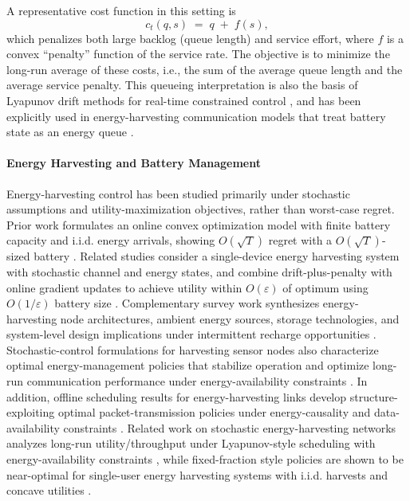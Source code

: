 \documentclass[11pt]{article}
\begin{document}
A representative cost function in this setting is
\[
c_t(q,s) \;=\; q \;+\; f(s),
\]
which penalizes both large backlog (queue length) and service effort, where \(f\) is a convex “penalty” function of the service rate.  
The objective is to minimize the long-run average of these costs, i.e., the sum of the average queue length and the average service penalty. This queueing interpretation is also the basis of Lyapunov drift methods for real-time constrained control \cite{neely2010stochastic}, and has been explicitly used in energy-harvesting communication models that treat battery state as an energy queue \cite{sudevalayam2011energy,sharma2010optimal,yang2011optimal}.



\paragraph{Energy Harvesting and Battery Management}
Energy-harvesting control has been studied primarily under stochastic assumptions and utility-maximization objectives, rather than worst-case regret. Prior work formulates an online convex optimization model with finite battery capacity and i.i.d. energy arrivals, showing $O(\sqrt{T})$ regret with a $O(\sqrt{T})$-sized battery \cite{Asgari2020}. Related studies consider a single-device energy harvesting system with stochastic channel and energy states, and combine drift-plus-penalty with online gradient updates to achieve utility within $O(\varepsilon)$ of optimum using $O(1/\varepsilon)$ battery size \cite{Yu2019}. Complementary survey work synthesizes energy-harvesting node architectures, ambient energy sources, storage technologies, and system-level design implications under intermittent recharge opportunities \cite{sudevalayam2011energy}. Stochastic-control formulations for harvesting sensor nodes also characterize optimal energy-management policies that stabilize operation and optimize long-run communication performance under energy-availability constraints \cite{sharma2010optimal}. In addition, offline scheduling results for energy-harvesting links develop structure-exploiting optimal packet-transmission policies under energy-causality and data-availability constraints \cite{yang2011optimal}. Related work on stochastic energy-harvesting networks analyzes long-run utility/throughput under Lyapunov-style scheduling with energy-availability constraints \cite{Huang2013}, while fixed-fraction style policies are shown to be near-optimal for single-user energy harvesting systems with i.i.d. harvests and concave utilities \cite{arafa2017energy}.
\end{document}
